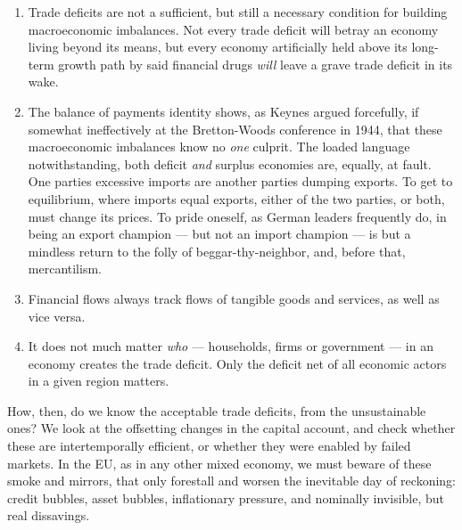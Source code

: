\begin{enumerate}
	\item Trade deficits are not a sufficient, but still a necessary condition for building macroeconomic imbalances.
	Not every trade deficit will betray an economy living beyond its means, but every economy artificially held above its long-term growth path by said financial drugs \emph{will} leave a grave trade deficit in its wake.

	\item The balance of payments identity shows, as Keynes  argued forcefully, if somewhat ineffectively at the Bretton-Woods conference in 1944, that these macroeconomic imbalances know no \emph{one} culprit.
	The loaded language notwithstanding, both deficit \emph{and} surplus economies are, equally, at fault.
	One parties excessive imports are another parties dumping exports.
	To get to equilibrium, where imports equal exports, either of the two parties, or both, must change its prices.
	To pride oneself, as German leaders frequently do, in being an export champion --- but not an import champion --- is but a mindless return to the folly of beggar-thy-neighbor, and, before that, mercantilism.

	\item Financial flows always track flows of tangible goods and services, as well as vice versa.

	\item It does not much matter \emph{who} --- households, firms or government --- in an economy creates the trade deficit.
	Only the deficit net of all economic actors in a given region matters.
\end{enumerate}

How, then, do we know the acceptable trade deficits, from the unsustainable ones?
We look at the offsetting changes in the capital account, and check whether these are intertemporally efficient, or whether they were enabled by failed markets.
In the \gls{EU}, as in any other mixed economy, we must beware of these smoke and mirrors, that only forestall and worsen the inevitable day of reckoning:
credit bubbles, asset bubbles, inflationary pressure, and nominally invisible, but real dissavings.

